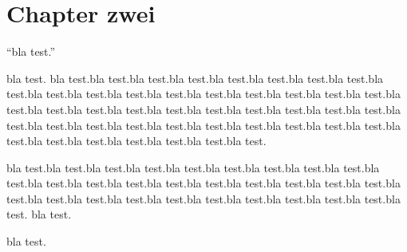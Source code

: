\chapter{Chapter zwei}
\enquote{bla test.}

bla test. bla test.bla test.bla test.bla test.bla test.bla test.bla test.bla test.bla test.bla test.bla test.bla test.bla test.bla test.bla test.bla test.bla test.bla test.bla test.bla test.bla test.bla test.bla test.bla test.bla test.bla test.bla test.bla test.bla test.bla test.bla test.bla test.bla test.bla test.bla test.bla test.bla test.bla test.bla test.bla test.bla test.bla test.bla test.bla test.bla test.

bla test.bla test.bla test.bla test.bla test.bla test.bla test.bla test.bla test.bla test.bla test.bla test.bla test.bla test.bla test.bla test.bla test.bla test.bla test.bla test.bla test.bla test.bla test.bla test.bla test.bla test.bla test.bla test.bla test.bla test.
bla test.

bla test.
